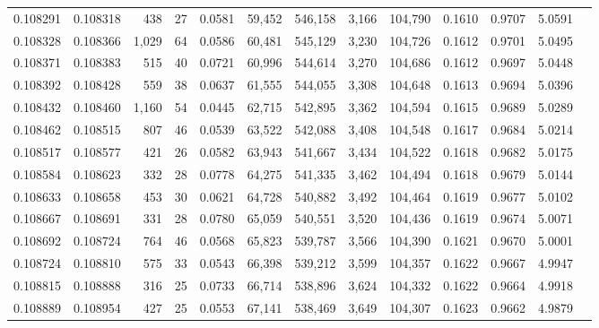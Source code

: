 \begin{tabular}{rrrrrrrrrrrrr}
0.108291 & 0.108318 &   438 &  27 &                                     0.0581 &  59,452 & 546,158 &   3,166 & 104,790 & 0.1610 & 0.9707 & 5.0591 \\
0.108328 & 0.108366 & 1,029 &  64 &                                     0.0586 &  60,481 & 545,129 &   3,230 & 104,726 & 0.1612 & 0.9701 & 5.0495 \\
0.108371 & 0.108383 &   515 &  40 &                                     0.0721 &  60,996 & 544,614 &   3,270 & 104,686 & 0.1612 & 0.9697 & 5.0448 \\
0.108392 & 0.108428 &   559 &  38 &                                     0.0637 &  61,555 & 544,055 &   3,308 & 104,648 & 0.1613 & 0.9694 & 5.0396 \\
0.108432 & 0.108460 & 1,160 &  54 &                                     0.0445 &  62,715 & 542,895 &   3,362 & 104,594 & 0.1615 & 0.9689 & 5.0289 \\
0.108462 & 0.108515 &   807 &  46 &                                     0.0539 &  63,522 & 542,088 &   3,408 & 104,548 & 0.1617 & 0.9684 & 5.0214 \\
0.108517 & 0.108577 &   421 &  26 &                                     0.0582 &  63,943 & 541,667 &   3,434 & 104,522 & 0.1618 & 0.9682 & 5.0175 \\
0.108584 & 0.108623 &   332 &  28 &                                     0.0778 &  64,275 & 541,335 &   3,462 & 104,494 & 0.1618 & 0.9679 & 5.0144 \\
0.108633 & 0.108658 &   453 &  30 &                                     0.0621 &  64,728 & 540,882 &   3,492 & 104,464 & 0.1619 & 0.9677 & 5.0102 \\
0.108667 & 0.108691 &   331 &  28 &                                     0.0780 &  65,059 & 540,551 &   3,520 & 104,436 & 0.1619 & 0.9674 & 5.0071 \\
0.108692 & 0.108724 &   764 &  46 &                                     0.0568 &  65,823 & 539,787 &   3,566 & 104,390 & 0.1621 & 0.9670 & 5.0001 \\
0.108724 & 0.108810 &   575 &  33 &                                     0.0543 &  66,398 & 539,212 &   3,599 & 104,357 & 0.1622 & 0.9667 & 4.9947 \\
0.108815 & 0.108888 &   316 &  25 &                                     0.0733 &  66,714 & 538,896 &   3,624 & 104,332 & 0.1622 & 0.9664 & 4.9918 \\
0.108889 & 0.108954 &   427 &  25 &                                     0.0553 &  67,141 & 538,469 &   3,649 & 104,307 & 0.1623 & 0.9662 & 4.9879 \\

\end{tabular}

